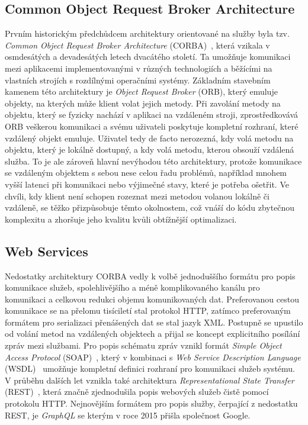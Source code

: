 \subsection{Common Object Request Broker Architecture}

Prvním historickým předchůdcem architektury orientované na služby
byla tzv. \textit{Common Object Request Broker Architecture}
(CORBA)~\cite{siegel2000corba}, která vzikala v osmdesátých a devadesátých letech
dvacátého století. Ta umožňuje komunikaci mezi aplikacemi implementovanými v
různých technologiích a běžícími na vlastních strojích s rozdílnými
operačními systémy. Základním stavebním kamenem této architektury
je \textit{Object Request Broker} (ORB), který emuluje objekty,
na kterých může klient volat jejich metody. Při zavolání metody
na objektu, který se fyzicky nachází v aplikaci na vzdáleném stroji,
zprostředkovává ORB veškerou komunikaci a svému uživateli poskytuje
kompletní rozhraní, které vzdálený objekt emuluje. Uživatel tedy de
facto nerozezná, kdy volá metodu na objektu, který je lokálně dostupný,
a kdy volá metodu, kterou obsouží vzdálená služba. To je ale zároveň
hlavní nevýhodou této architektury, protože komunikace se vzdáleným
objektem s sebou nese celou řadu problémů, například mnohem vyšší latenci
při komunikaci nebo výjimečné stavy, které je potřeba ošetřit. Ve chvíli,
kdy klient není schopen rozeznat mezi metodou volanou lokálně či vzdáleně,
se těžko přizpůsobuje těmto okolnostem, což vnáší do kódu zbytečnou
komplexitu a zhoršuje jeho kvalitu kvůli obtížnější optimalizaci.

\subsection{Web Services}

Nedostatky architektury CORBA vedly k volbě jednoduššího
formátu pro popis komunikace služeb, spolehlivějšího a méně
komplikovaného kanálu pro komunikaci a celkovou redukci
objemu komunikovaných dat. Preferovanou cestou komunikace
se na přelomu tisíciletí stal protokol HTTP, zatímco preferovaným formátem
pro serializaci přenášených dat se stal jazyk XML.
Postupně se upustilo od volání metod na vzdálených objektech a přijal
se koncept explicitního posílání zpráv mezi službami.
Pro popis schématu zpráv vznikl formát \textit{Simple Object Access
Protocol} (SOAP)~\cite{box2000simple}, který v kombinaci s
\textit{Web Service Description Language} (WSDL)~\cite{christensen2001web}
umožňuje kompletní definici rozhraní pro komunikaci služeb systému.
V průběhu dalších let vznikla také architektura \textit{Representational
State Transfer} (REST)~\cite{fielding2000rest}, která značně zjednodušila
popis webových služeb čistě pomocí protokolu HTTP. Nejnovějším formátem
pro popis služby, čerpající z nedostatku REST, je \textit{GraphQL}
se kterým v roce 2015 přišla společnost Google.

